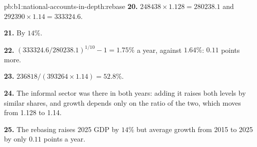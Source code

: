\begin{solution}{pb:b1:national-accounts-in-depth:rebase}
\textbf{20.} $248438 \times 1.128 = 280238.1$ and $292390 \times 1.14 = 333324.6$.

\textbf{21.} By $14\%$.

\textbf{22.} $(333324.6/280238.1)^{1/10} - 1 = 1.75\%$ a year, against $1.64\%$: $0.11$ points more.

\textbf{23.} $236818/(393264 \times 1.14) = 52.8\%$.

\textbf{24.} The informal sector was there in both years: adding it raises
both levels by similar shares, and growth depends only on the ratio of the
two, which moves from 1.128 to 1.14.

\textbf{25.} The rebasing raises 2025 GDP by $14\%$ but average growth from 2015 to
2025 by only $0.11$ points a year.
\end{solution}
